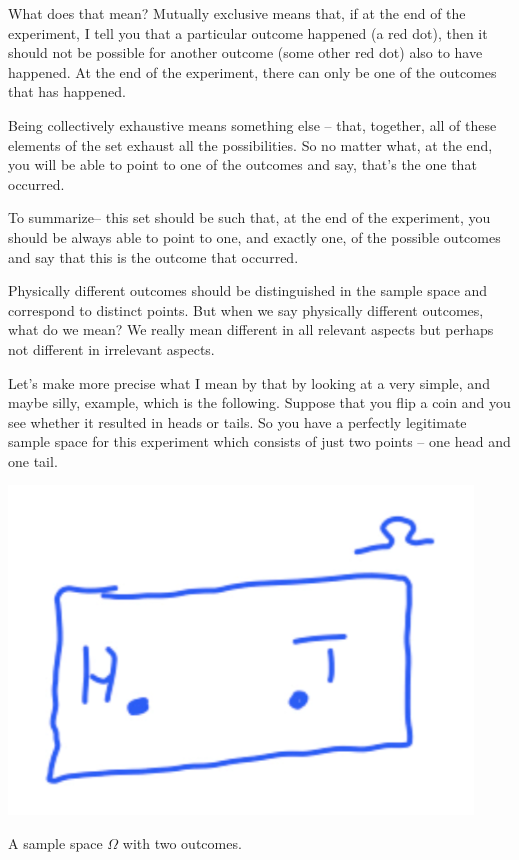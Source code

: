 \documentclass{tufte-handout}
\begin{document}
What does that mean? Mutually exclusive means that, if at 
the end of the experiment, I tell you that a particular 
outcome happened (a red dot),  then it should not be possible for another outcome (some other red dot) also to have happened. At the end of the
experiment, there can only be one of the outcomes that has happened.

Being collectively exhaustive means something else -- that, 
together, all of these elements of the set
exhaust all the possibilities. So no matter what, at the end, you will be able to point to one of the
outcomes and say, that's the one that occurred. 

To summarize-- this set should be such that, at the end
of the experiment, you should be always able to point to one, and exactly one, of the possible outcomes
and say that this is the outcome that occurred.

Physically different outcomes should be distinguished in the sample space and correspond to distinct
points. But when we say physically different outcomes, what do we mean? We really mean different in
all relevant aspects but perhaps not different in irrelevant aspects.

 Let's make more precise what I mean by that by looking at a very simple, and maybe silly, example,
which is the following. Suppose that you flip a coin and you see whether it resulted in heads or tails. So
you have a perfectly legitimate sample space for this experiment which consists of just two points -- one
head and one tail.
\begin{marginfigure}
  \includegraphics[width=\linewidth]{HeadsTails}
  \caption{A sample space $\Omega$ with two outcomes.}
  \label{fig:marginfig}
\end{marginfigure}
\end{document}
